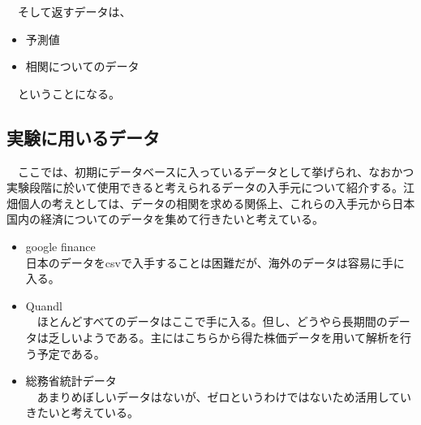 \documentclass{scrartcl}
\begin{document}
　そして返すデータは、\\
\begin{itemize}
\item 予測値\\
\item 相関についてのデータ\\
\end{itemize}

　ということになる。\\

\subsection{実験に用いるデータ}
\label{sec:orgcfaae24}
　ここでは、初期にデータベースに入っているデータとして挙げられ、なおかつ実験段階に於いて使用できると考えられるデータの入手元について紹介する。江畑個人の考えとしては、データの相関を求める関係上、これらの入手元から日本国内の経済についてのデータを集めて行きたいと考えている。\\
\begin{itemize}
\item google finance\\
日本のデータをcsvで入手することは困難だが、海外のデータは容易に手に入る。\\
\item Quandl\\
　ほとんどすべてのデータはここで手に入る。但し、どうやら長期間のデータは乏しいようである。主にはこちらから得た株価データを用いて解析を行う予定である。\\
\item 総務省統計データ\\
　あまりめぼしいデータはないが、ゼロというわけではないため活用していきたいと考えている。\\
\end{itemize}
\end{document}

